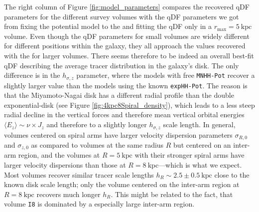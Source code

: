 \documentclass[iop,revtex4,numberedappendix,appendixfloats]{emulateapj}
\begin{document}
The right column of Figure \ref{fig:model_parameters} compares the recovered qDF parameters for the different survey volumes with the qDF parameters we got from fixing the potential model to the  and fitting the qDF only in a $r_\text{max}=5~\text{kpc}$ volume. Even though the qDF parameters for small volumes are widely different for different positions within the galaxy, they all approach the values recovered with the  for larger volumes. There seems therefore to be indeed an overall best-fit qDF describing the average tracer distribution in the galaxy's disk. The only difference is in the $h_{\sigma,z}$ parameter, where the models with free \texttt{MNHH-Pot} recover a slightly larger value than the models using the known \texttt{expHH-Pot}. The reason is that the Miyamoto-Nagai disk has a different radial profile than the double exponential-disk (see Figure \ref{fig:4kpc8Spiral_density}), which leads to a less steep radial decline in the vertical forces and therefore mean vertical orbital energies $\langle E_z \rangle \sim \nu \times J_z$ and therefore to a slightly longer $h_{\sigma,z}$ scale length. In general, volumes centered on spiral arms have larger velocity dispersion parameters $\sigma_{R,0}$ and $\sigma_{z,0}$ as compared to volumes at the same radius $R$ but centered on an inter-arm region, and the volumes at $R=5~\text{kpc}$ with their stronger spiral arms have larger velocity dispersions than those at $R=8~\text{kpc}$---which is what we expect. Most volumes recover similar tracer scale lengths $h_R\sim2.5\pm0.5~\text{kpc}$ close to the known disk scale length; only the volume centered on the inter-arm region at $R=8~\text{kpc}$ recovers much longer $h_R$. This might be related to the fact, that volume \texttt{I8} is dominated by a especially large inter-arm region.
\end{document}
